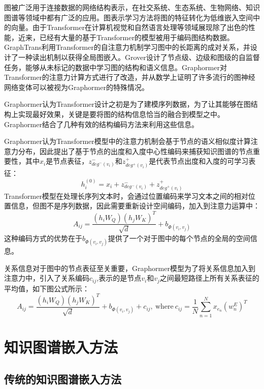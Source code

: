 图被广泛用于连接数据的网络结构表示，在社交系统、生态系统、生物网络、知识图谱等领域中都有广泛的应用。图表示学习方法将图的特征转化为低维嵌入空间中的向量。由于Transformer在计算机视觉和自然语言处理等领域展现除了出色的性能，近来，已经有大量的基于Transformer的模型被用于编码图结构数据。GraphTrans利用Transformer的自注意力机制学习图中的长距离的成对关系，并设计了一种读出机制以获得全局图嵌入。Grover设计了节点级、边级和图级的自监督任务，能够从未标记的数据中学习图的结构和语义信息。Graphormer对Transformer的注意力计算方式进行了改造，并从数学上证明了许多流行的图神经网络变体可以被视为Graphormer的特殊情况。

Graphormer认为Transformer设计之初是为了建模序列数据，为了让其能够在图结构上实现最好效果，关键是要将图的结构信息恰当的融合到模型之中。Graphormer结合了几种有效的结构编码方法来利用这些信息。

Graphormer认为Transformer模型中的注意力机制会基于节点的语义相似度计算注意力分布，因此提出了基于节点的出度和入度中心性编码来捕获知识图谱的节点重要性，其中$x_i$是节点表征，$z^-_{deg^-(v_i)}$和$z^+_{deg^+(v_i)}$是代表节点出度和入度的可学习表征：
\begin{equation}
  h_i^{(0)}=x_i+z^-_{deg^-(v_i)}+z^+_{deg^+(v_i)}
\end{equation}
Transformer模型在处理长序列文本时，会通过位置编码来学习文本之间的相对位置信息，但图不是序列数据，因此需要重新设计空间编码，加入到注意力运算中：
\begin{equation}
  A_{ij}=\frac{(h_iW_Q)(h_jW_K)^T}{\sqrt{d}}+b_{\varPhi (v_i,v_j)}
\end{equation}
这种编码方式的优势在于$b_{\varPhi (v_i,v_j)}$提供了一个对于图中的每个节点的全局的空间信息。

关系信息对于图中的节点表征至关重要，Graphormer模型为了将关系信息加入到注意力中，引入了关系编码$c_{ij}$,表示的是节点$v_i$和$v_j$之间最短路径上所有关系表征的平均值，如下图公式所示：
\begin{equation}
  A_{ij}=\frac{(h_iW_Q)(h_jW_K)^T}{\sqrt{d}}+b_{\varPhi (v_i,v_j)}+c_{ij},\ \mbox{where} \ c_{ij} = \frac{1}{N}\sum_{n=1}^Nx_{e_n}(w_n^E)^T
\end{equation}
\section{知识图谱嵌入方法}

\subsection{传统的知识图谱嵌入方法}

